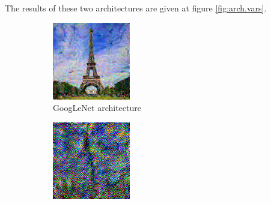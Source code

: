 \documentclass[twocolumn,superscriptaddress,aps,floatfix,nofootinbib]{revtex4-1}
\begin{document}
    The results of these two architectures are given at figure \ref{fig:arch.vars}.
    
    \begin{figure}[ht]
        \centering
        \begin{subfigure}[b]{0.22\textwidth}
            \centering
            \includegraphics[width=\textwidth]{resources/png/model/googlenet.png}
            \caption{GoogLeNet architecture}
        \end{subfigure}
        \hfill
        \begin{subfigure}[b]{0.22\textwidth}
            \centering
            \includegraphics[width=\textwidth]{resources/png/model/alexnet.png}

\end{subfigure}
\end{figure}
\end{document}
